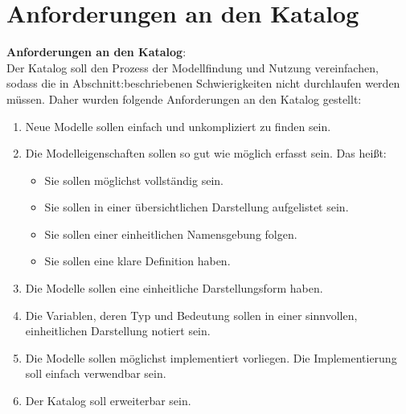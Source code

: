 \section{Anforderungen an den Katalog} %
\label{Ch:ErstProz:Sec:Struktur}
\textbf{Anforderungen an den Katalog}:\\ %
Der Katalog soll den Prozess der Modellfindung und Nutzung vereinfachen, sodass die in Abschnitt:\glqq {}\grqq beschriebenen Schwierigkeiten nicht durchlaufen werden müssen. Daher wurden folgende Anforderungen an den Katalog gestellt:
\begin{enumerate}[label=\textbf{Anforderung A.\arabic*}:, ref=\textbf{A.\arabic*}, wide=0pt, leftmargin=*]
	\item \label{A.Findbarkeit}Neue Modelle sollen einfach und unkompliziert zu finden sein.
	\item \label{A.Modelleigenschaften}Die Modelleigenschaften sollen so gut wie möglich erfasst sein. Das heißt:
	\begin{itemize}[label=$\bullet$]
		\item Sie sollen möglichst vollständig sein.
		\item Sie sollen in einer übersichtlichen Darstellung aufgelistet sein.
		\item Sie sollen einer einheitlichen Namensgebung folgen.
		\item Sie sollen eine klare Definition haben.
	\end{itemize}
	\item \label{A.Darstellung_Gleichungen}Die Modelle sollen eine einheitliche Darstellungsform haben.
	\item \label{A.Darstellung_Variablen}Die Variablen, deren Typ und Bedeutung sollen in einer sinnvollen, einheitlichen Darstellung notiert sein.
	\item \label{A.Implementierung}Die Modelle sollen möglichst implementiert vorliegen. Die Implementierung soll einfach verwendbar sein.
	\item \label{A.Erweiterbarkeit}Der Katalog soll erweiterbar sein. %
\end{enumerate}
